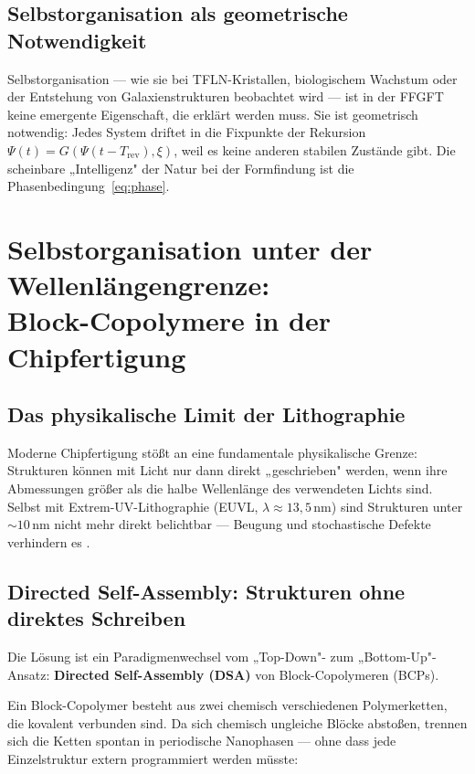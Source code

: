 \subsection{Selbstorganisation als geometrische Notwendigkeit}

Selbstorganisation — wie sie bei TFLN-Kristallen, biologischem Wachstum
oder der Entstehung von Galaxienstrukturen beobachtet wird — ist in der
FFGFT keine emergente Eigenschaft, die erklärt werden muss. Sie ist
geometrisch notwendig: Jedes System driftet in die Fixpunkte der
Rekursion $\Psi(t) = G(\Psi(t-T_\text{rev}), \xi)$, weil es keine
anderen stabilen Zustände gibt. Die scheinbare „Intelligenz" der Natur
bei der Formfindung ist die Phasenbedingung~\eqref{eq:phase}.

\section{Selbstorganisation unter der Wellenlängengrenze: \\
         Block-Copolymere in der Chipfertigung}

\subsection{Das physikalische Limit der Lithographie}

Moderne Chipfertigung stößt an eine fundamentale physikalische Grenze:
Strukturen können mit Licht nur dann direkt „geschrieben" werden, wenn
ihre Abmessungen größer als die halbe Wellenlänge des verwendeten Lichts sind.
Selbst mit Extrem-UV-Lithographie (EUVL, $\lambda \approx 13{,}5\,\text{nm}$)
sind Strukturen unter $\sim 10\,\text{nm}$ nicht mehr direkt belichtbar —
Beugung und stochastische Defekte verhindern es \cite{DSA2026,Lee2025}.

\subsection{Directed Self-Assembly: Strukturen ohne direktes Schreiben}

Die Lösung ist ein Paradigmenwechsel vom „Top-Down"- zum „Bottom-Up"-Ansatz:
\textbf{Directed Self-Assembly (DSA)} von Block-Copolymeren (BCPs).

Ein Block-Copolymer besteht aus zwei chemisch verschiedenen Polymerketten,
die kovalent verbunden sind. Da sich chemisch ungleiche Blöcke abstoßen,
trennen sich die Ketten spontan in periodische Nanophasen — ohne dass
jede Einzelstruktur extern programmiert werden müsste:

